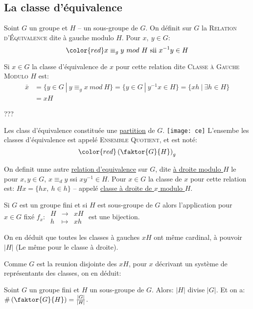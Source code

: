 \subsection{La classe d'équivalence} 

\begin{definition}
	Soint $G$ un groupe et $H$ -- un sous-groupe de $G$. On définit sur $G$ la \textsc{Relation d'Équivalence} dite à gauche modulo $H$. Pour $x,\ y\in G$: 
	\[ \color{red} x\equiv_g y\ mod\ H \mbox{ sii } x^{-1}y\in H \]
	\vspace{-8mm}
\end{definition}

Si $x\in G$ la classe d'équivalence de $x$ pour cette relation dite \textsc{Classe à Gauche Modulo $H$} est:
\begin{align*}	
	\bar{x} & =\{y\in G\ |\ y\equiv_g x\  mod\ H\}=\{y\in G\ |\ y^{-1}x\in H\}=\{xh\ |\ \exists h\in H\}\\
	& =xH
\end{align*} 

	???

\begin{remark}
	Les class d'équivalence constituée une \underline{partition} de $G$.
	\texttt{[image: ce]}
	L'ensembe les classes d'équivalence est appelé \textsc{Ensemble Quotient}, et est noté:
	$$ \color{red}\left(	\faktor{G}{H}	\right)_g$$
\end{remark}

On definit unne autre \underline{relation d'equivalence} sur $G$, dite \underline{à droite modulo $H$} le pour $x, y\in G$, $x\equiv_dy$ ssi $xy^{-1}\in H$. Pour $x\in G$ la classe de $x$ pour cette relation est: $Hx=\{hx,\ h\in h\}$ -- appelé \underline{classe à droite de $x$ modulo $H$}.

Si $G$ est un groupe fini et si $H$ est sous-groupe de $G$ alors l'application pour $x\in G$ fixé $f_x:\ \begin{array}{rcl}H &\rightarrow & xH\\ h &\mapsto & xh\end{array}$ est une bijection.

On en déduit que toutes les classes à gauches $xH$ ont même cardinal, à pouvoir $|H|$ (Le même pour le classe à droite).

Comme $G$ est la reunion disjointe des $xH$, pour $x$ décrivant un système de représentants des classes, on en déduit:

\begin{theorem}
	Soint $G$ un groupe fini et $H$ un sous-groupe de $G$.
	Alors: $|H|$ divise $|G|$.
	Et on a: $\#\left(\faktor{G}{H}\right)=\frac{|G|}{|H|}$.	
\end{theorem}

